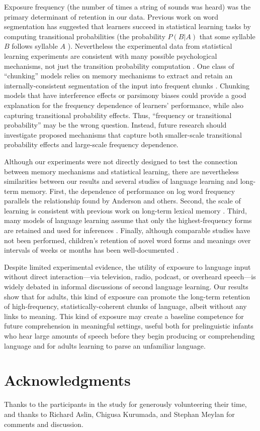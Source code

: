 \documentclass[10pt]{article}
\begin{document}
Exposure frequency (the number of times a string of sounds was heard) was the primary determinant of retention in our data. Previous work on word segmentation has suggested that learners succeed in statistical learning tasks by computing transitional probabilities (the probability $P(B|A)$ that some syllable $B$ follows syllable $A$ \cite{saffran1996a, saffran1996b}). Nevertheless the experimental data from statistical learning experiments are consistent with many possible psychological mechanisms, not just the transition probability computation \cite{kurumada2011,frank2010,orban2008}. One class of ``chunking'' models relies on memory mechanisms to extract and retain an internally-consistent segmentation of the input into frequent chunks \cite{perruchet1998,goldwater2009,french2011}. Chunking models that have interference effects or parsimony biases could provide a good explanation for the frequency dependence of learners' performance, while also capturing transitional probability effects. Thus, ``frequency or transitional probability'' may be the wrong question. Instead, future research should investigate proposed mechanisms that capture both smaller-scale transitional probability effects and large-scale frequency dependence.  

Although our experiments were not directly designed to test the connection between memory mechanisms and statistical learning, there are nevertheless similarities between our results and several studies of language learning and long-term memory. First, the dependence of performance on log word frequency parallels the relationship found by Anderson \cite{anderson1990} and others. Second, the scale of learning is consistent with previous work on long-term lexical memory \cite{bahrick1993}. Third, many models of language learning assume that only the highest-frequency forms are retained and used for inferences \cite{swingley2005,mintz1995}. Finally, although comparable studies have not been performed, children's retention of novel word forms and meanings over intervals of weeks or months has been well-documented \cite{markson1997,jusczyk1997}.

Despite limited experimental evidence, the utility of exposure to language input without direct interaction---via television, radio, podcast, or overheard speech---is widely debated in informal discussions of second language learning. Our results show that for adults, this kind of exposure can promote the long-term retention of high-frequency, statistically-coherent chunks of language, albeit without any links to meaning. This kind of exposure may create a baseline competence for future comprehension in meaningful settings, useful both for prelinguistic infants who hear large amounts of speech before they begin producing or comprehending language and for adults learning to parse an unfamiliar language.

\section*{Acknowledgments}

Thanks to the participants in the study for generously volunteering their time, and thanks to Richard Aslin, Chigusa Kurumada, and Stephan Meylan for comments and discussion. 


\end{document}
